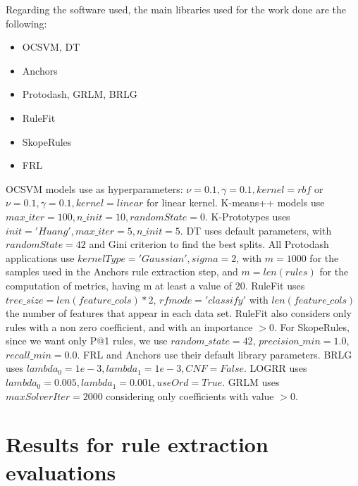 Regarding the software used, the main libraries used for the work done are the following: 
\begin{itemize}
    \item OCSVM, DT \parencite{sklearn-api}
    \item Anchors \parencite{alibi} 
    \item Protodash, GRLM, BRLG \parencite{aix360-sept-2019}
    \item RuleFit \parencite{rulefit}
    \item SkopeRules \parencite{skrules}
    \item FRL \parencite{bayesian-rules}
\end{itemize}

OCSVM models use as hyperparameters: $\nu = 0.1, \gamma = 0.1, kernel = rbf$ or $\nu = 0.1, \gamma = 0.1, kernel = linear$ for linear kernel. K-means++ models use $max \_ iter = 100, n \_ init = 10, randomState = 0$. K-Prototypes uses $init='Huang', max\_iter=5, n\_init=5$. DT uses default parameters, with $randomState=42$ and Gini criterion to find the best splits. All Protodash applications use $kernelType='Gaussian', sigma=2$, with $m=1000$ for the samples used in the Anchors rule extraction step, and $m=len(rules)$ for the computation of metrics, having m at least a value of 20. 
RuleFit uses $tree\_size=len(feature\_cols)*2$, $rfmode='classify'$ with $len(feature\_cols)$ the number of features that appear in each data set. RuleFit also considers only rules with a non zero coefficient, and with an importance $>0$. For SkopeRules, since we want only P@1 rules, we use $random\_state=42$, $precision\_min=1.0$, $recall\_min=0.0$. FRL and Anchors use their default library parameters. BRLG uses $lambda_0=1e-3, lambda_1=1e-3, CNF=False$. LOGRR uses $lambda_0=0.005, lambda_1=0.001, useOrd=True$. GRLM uses $maxSolverIter=2000$ considering only coefficients with value $>0$. 

\newpage
\section{Results for rule extraction evaluations}\label{sec:annex-rule-extraction-results}

